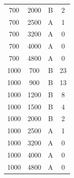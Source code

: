 \begin{longtable}{ccrc}
700 & 2000 & B & 2 \\
700 & 2500 & A & 1 \\
700 & 3200 & A & 0 \\
700 & 4000 & A & 0 \\
700 & 4800 & A & 0 \\
1000 & 700 & B & 23 \\
1000 & 900 & B & 13 \\
1000 & 1200 & B & 8 \\
1000 & 1500 & B & 4 \\
1000 & 2000 & B & 2 \\
1000 & 2500 & A & 1 \\
1000 & 3200 & A & 0 \\
1000 & 4000 & A & 0 \\
1000 & 4800 & A & 0 \\
\bottomrule
\end{longtable}

